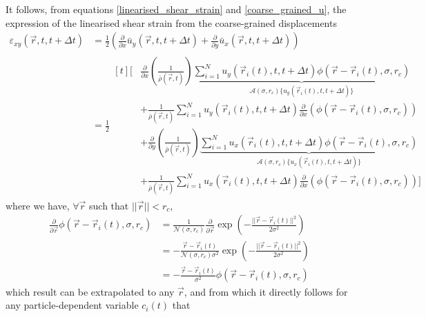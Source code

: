 \documentclass[class=report, float=false, crop=false]{standalone}
\begin{document}
It follows, from equations \ref{linearised_shear_strain} and \ref{coarse_grained_u}, the expression of the linearised shear strain from the coarse-grained displacements
\begin{equation}
\begin{aligned}
\varepsilon_{xy}(\vec{r}, t, t + \Delta t) &= \frac{1}{2} \left(\frac{\partial}{\partial x}\bar{u}_y(\vec{r}, t, t + \Delta t) + \frac{\partial}{\partial y}\bar{u}_x(\vec{r}, t, t + \Delta t)\right)\\
&= \frac{1}{2}\begin{aligned}[t]\Bigg[&\frac{\partial}{\partial x}\left(\frac{1}{\bar{\rho}(\vec{r}, t)}\right)\underbrace{\sum_{i=1}^N u_y(\vec{r}_i(t), t, t + \Delta t)\phi(\vec{r} - \vec{r}_i(t), \sigma, r_c)}_{\displaystyle\mathcal{A}(\sigma, r_c)\{u_y(\vec{r}_i(t), t, t + \Delta t)\}}\\
&+ \frac{1}{\bar{\rho}(\vec{r}, t)}\sum_{i=1}^N u_y(\vec{r}_i(t), t, t + \Delta t) \frac{\partial}{\partial x}\left(\phi(\vec{r} - \vec{r}_i(t), \sigma, r_c)\right)\\
&+ \frac{\partial}{\partial y}\left(\frac{1}{\bar{\rho}(\vec{r}, t)}\right)\underbrace{\sum_{i=1}^N u_x(\vec{r}_i(t), t, t + \Delta t)\phi(\vec{r} - \vec{r}_i(t), \sigma, r_c)}_{\displaystyle\mathcal{A}(\sigma, r_c)\{u_x(\vec{r}_i(t), t, t + \Delta t)\}}\\
&+ \frac{1}{\bar{\rho}(\vec{r}, t)}\sum_{i=1}^N u_x(\vec{r}_i(t), t, t + \Delta t) \frac{\partial}{\partial x}\left(\phi(\vec{r} - \vec{r}_i(t), \sigma, r_c)\right)\Bigg]\end{aligned}
\end{aligned}
\end{equation}
where we have, $\forall \vec{r}$ such that $||\vec{r}|| < r_c$,
\begin{equation}
\begin{aligned}
\frac{\partial}{\partial \vec{r}}\phi(\vec{r} - \vec{r}_i(t), \sigma, r_c) &= \frac{1}{\mathcal{N}(\sigma, r_c)}\frac{\partial}{\partial\vec{r}} \exp\left(-\frac{||\vec{r} - \vec{r}_i(t)||^2}{2\sigma^2}\right)\\
&= - \frac{\vec{r} - \vec{r}_i(t)}{\mathcal{N}(\sigma, r_c)\sigma^2} \exp\left(-\frac{||\vec{r} - \vec{r}_i(t)||^2}{2\sigma^2}\right)\\
&= - \frac{\vec{r} - \vec{r}_i(t)}{\sigma^2}\phi(\vec{r} - \vec{r}_i(t), \sigma, r_c)
\end{aligned}
\end{equation}
which result can be extrapolated to any $\vec{r}$, and from which it directly follows for any particle-dependent variable $c_i(t)$ that
\end{document}

